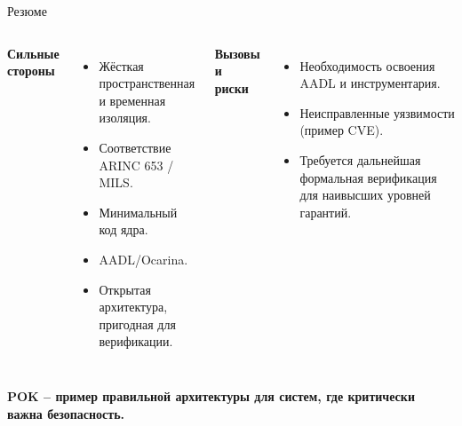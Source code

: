 \begin{frame}{Резюме}
    \begin{columns}[T]
        \textbf{Сильные стороны}
        \begin{itemize}
            \item Жёсткая пространственная и временная изоляция.
            \item Соответствие ARINC 653 / MILS.
            \item Минимальный код ядра.
            \item AADL/Ocarina.
            \item Открытая архитектура, пригодная для верификации.
        \end{itemize}
        \textbf{Вызовы и риски}
        \begin{itemize}
            \item Необходимость освоения AADL и инструментария.
            \item Неисправленные уязвимости (пример CVE).
            \item Требуется дальнейшая формальная верификация для наивысших уровней гарантий.
        \end{itemize}
    \end{columns}
    \vfill
    \begin{center}
        \textbf{POK -- пример правильной архитектуры для систем, где критически важна безопасность.}
    \end{center}
\end{frame}